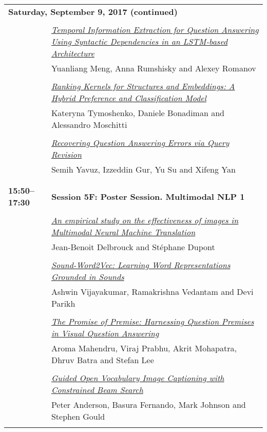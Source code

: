 \begin{tabular}{p{20mm}p{128mm}}
\\
\multicolumn{2}{l}{\bf Saturday, September 9, 2017 (continued)} \\\\
 & \hyperlink{page.896}{\em Temporal Information Extraction for Question Answering Using Syntactic Dependencies in an LSTM-based Architecture}\\
         & Yuanliang Meng, Anna Rumshisky and Alexey Romanov \\
\\

 & \hyperlink{page.906}{\em Ranking Kernels for Structures and Embeddings: A Hybrid Preference and Classification Model}\\
         & Kateryna Tymoshenko, Daniele Bonadiman and Alessandro Moschitti \\
\\

 & \hyperlink{page.912}{\em Recovering Question Answering Errors via Query Revision}\\
         & Semih Yavuz, Izzeddin Gur, Yu Su and Xifeng Yan \\
\\

\\{\bf 15:50--17:30} & {\bf Session 5F: Poster Session. Multimodal NLP 1 } \\
\\
 & \hyperlink{page.919}{\em An empirical study on the effectiveness of images in Multimodal Neural Machine Translation}\\
         & Jean-Benoit Delbrouck and St\'{e}phane Dupont \\
\\

 & \hyperlink{page.929}{\em Sound-Word2Vec: Learning Word Representations Grounded in Sounds}\\
         & Ashwin Vijayakumar, Ramakrishna Vedantam and Devi Parikh \\
\\

 & \hyperlink{page.935}{\em The Promise of Premise: Harnessing Question Premises in Visual Question Answering}\\
         & Aroma Mahendru, Viraj Prabhu, Akrit Mohapatra, Dhruv Batra and Stefan Lee \\
\\

 & \hyperlink{page.945}{\em Guided Open Vocabulary Image Captioning with Constrained Beam Search}\\
         & Peter Anderson, Basura Fernando, Mark Johnson and Stephen Gould \\
\\


\end{tabular}
